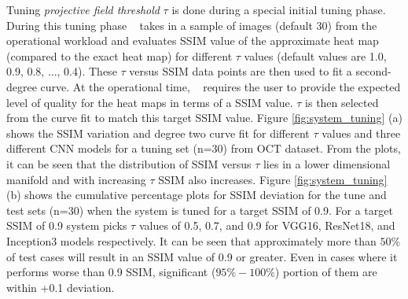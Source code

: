 Tuning \textit{projective field threshold} $\tau$ is done during a special initial tuning phase.
During this tuning phase \system~ takes in a sample of images (default 30) from the operational workload and evaluates SSIM value of the approximate heat map (compared to the exact heat map) for different $\tau$ values (default values are 1.0, 0.9, 0.8, ..., 0.4).
These $\tau$ versus SSIM data points are then used to fit a second-degree curve.
At the operational time, \system~ requires the user to provide the expected level of quality for the heat maps in terms of a SSIM value.
$\tau$ is then selected from the curve fit to match this target SSIM value.
Figure \ref{fig:system_tuning} (a) shows the SSIM variation and degree two curve fit for different $\tau$ values and three different CNN models for a tuning set (n=30) from OCT dataset.
From the plots, it can be seen that the distribution of SSIM versus $\tau$ lies in a lower dimensional manifold and with increasing $\tau$ SSIM also increases.
Figure \ref{fig:system_tuning} (b) shows the cumulative percentage plots for SSIM deviation for the tune and test sets (n=30) when the system is tuned for a target SSIM of 0.9.
For a target SSIM of 0.9 system picks $\tau$ values of 0.5, 0.7, and 0.9 for VGG16, ResNet18, and Inception3 models respectively.
It can be seen that approximately more than $50\%$ of test cases will result in an SSIM value of 0.9 or greater.
Even in cases where it performs worse than 0.9 SSIM, significant ($95\%-100\%$) portion of them are within +0.1 deviation.

